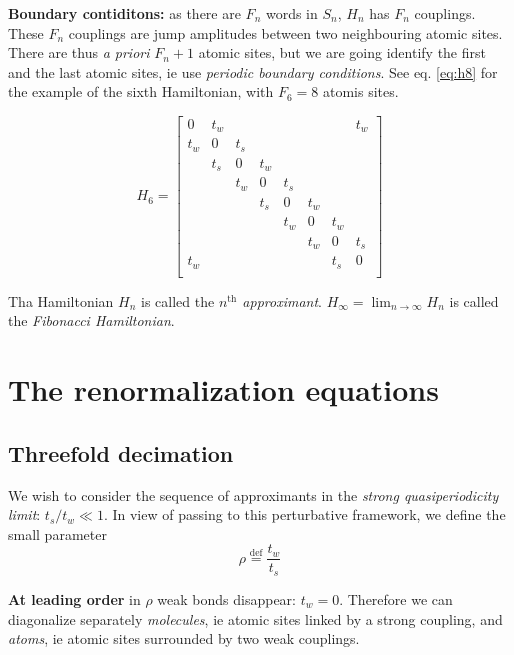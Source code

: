 \documentclass[11pt]{article}
\newcommand{\define}{\ensuremath{ \overset{\text{def}}{=} }}
\begin{document}
\textbf{Boundary contiditons:} as there are $F_n$ words in $S_n$, $H_n$ has $F_n$ couplings. These $F_n$ couplings are jump amplitudes between two neighbouring atomic sites. There are thus \textit{a priori} $F_n + 1$ atomic sites, but we are going identify the first and the last atomic sites, ie use \textit{periodic boundary conditions}.
See eq. \eqref{eq:h8} for the example of the sixth Hamiltonian, with $F_6 = 8$ atomis sites.

\begin{equation}
\label{eq:h8} 
	H_6 = 
	\begin{bmatrix}
	0 & t_w &   &   &   &   &   & t_w\\
	t_w & 0 & t_s &   &   &   &   &  \\
	  & t_s & 0 & t_w &   &   &   &  \\
	  &   & t_w & 0 & t_s &   &   &  \\
	  &   &   & t_s & 0 & t_w &   &  \\
	  &   &   &   & t_w & 0 & t_w &  \\
	  &   &   &   &   & t_w & 0 & t_s\\
	t_w &   &   &   &   &   & t_s & 0\\
\end{bmatrix}
\end{equation}

Tha Hamiltonian $H_n$ is called the \textit{$n^\text{th}$ approximant}. $H_\infty = \lim_{n \rightarrow \infty} H_n$ is called the \textit{Fibonacci Hamiltonian}.

\section{The renormalization equations}

\subsection{Threefold decimation}
We wish to consider the sequence of approximants in the \textit{strong quasiperiodicity limit}: $t_s/t_w \ll 1$.
In view of passing to this perturbative framework, we define the small parameter
\begin{equation}
	\rho \define \frac{t_w}{t_s}
\end{equation}

\textbf{At leading order} in $\rho$ weak bonds disappear: $t_w = 0$. 
Therefore we can diagonalize separately \textit{molecules}, ie atomic sites linked by a strong coupling, and \textit{atoms}, ie atomic sites surrounded by two weak couplings.
\end{document}
